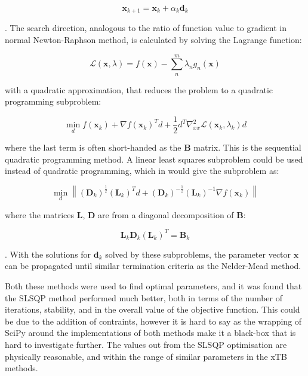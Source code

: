 \begin{equation}
\mathbf{x}_{k+1} = \mathbf{x}_k + \alpha_k \mathbf{d}_k
\end{equation}

. The search direction, analogous to the ratio of function value to gradient in 
normal Newton-Raphson method, is calculated by solving the Lagrange function:

\begin{equation}
\mathcal{L} \left(\mathbf{x}, \lambda\right) = f\left(\mathbf{x}\right) - \sum^m_n \lambda_n g_n \left( \mathbf{x}\right)
\end{equation}

with a quadratic approximation, that reduces the problem to a quadratic programming
subproblem:

\begin{equation}
\min_d f\left(\mathbf{x}_k\right) + \nabla f\left(\mathbf{x}_k\right)^T d + \frac{1}{2}d^T \nabla^2_{xx} \mathcal{L} \left(\mathbf{x}_k, \lambda_k \right) d
\end{equation}

where the last term is often short-handed as the $\mathbf{B}$ matrix. This is the 
sequential quadratic programming method. A linear least squares subproblem could
be used instead of quadratic programming, which in would give the subproblem as:

\begin{equation}
\min_d \left\| \left(\mathbf{D}_k\right)^{\frac{1}{2}} \left(\mathbf{L}_k\right)^T d + \left(\mathbf{D}_k\right)^{-\frac{1}{2}}\left(\mathbf{L}_k\right)^{-1}\nabla f \left(\mathbf{x}_k\right)\right\|
\end{equation}

where the matrices $\mathbf{L}$, $\mathbf{D}$ are from a diagonal decomposition 
of $\mathbf{B}$:

\begin{equation}
\mathbf{L}_k \mathbf{D}_k \left(\mathbf{L}_k\right)^T = \mathbf{B}_k
\end{equation}

. With the solutions for $\mathbf{d}_k$ solved by these subproblems, the parameter vector
$\mathbf{x}$ can be propagated until similar termination criteria as the Nelder-Mead
method.

Both these methods were used to find optimal parameters, and it was found that
the SLSQP method performed much better, both in terms of the number of iterations,
stability, and in the overall value of the objective function. This could be due 
to the addition of contraints, however it is hard to say as the wrapping of SciPy
around the implementations of both methods make it a black-box that is hard to 
investigate further. The values out from the SLSQP optimisation are physically
reasonable, and within the range of similar parameters in the xTB methods.

